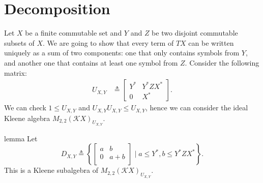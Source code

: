 \documentclass[a4paper,UKenglish,cleveref, autoref, thm-restate]{lipics-v2021}
\begin{document}
\section{Decomposition}
\label{sec:decomposition}

Let $X$ be a finite commutable set and $Y$ and $Z$ be two disjoint commutable
subsets of $X$.  We are going to show that every term of $TX$ can be written
uniquely as a sum of two components: one that only contains symbols from $Y$,
and another one that contains at least one symbol from $Z$. Consider the
following matrix:
\begin{align*}
  U_{X,Y} &  \triangleq 
      \begin{bmatrix}
        Y^* & Y^*ZX^* \\
        0 & X^*
      \end{bmatrix}.
\end{align*}
We can check $1  \leq  U_{X,Y}$ and $U_{X,Y}U_{X,Y}  \leq  U_{X,Y}$, hence we can consider
the ideal Kleene algebra $M_{2,2}(\mathcal{K}X)_{U_{X,Y}}$.

\begin{theoremEnd}{lemma}
  Let
  \[ D_{X,Y}  \triangleq  \left\{
      \begin{bmatrix}
        a & b \\
        0 & a + b \\
      \end{bmatrix}  \mid  a  \leq  Y^*, b  \leq  Y^*ZX^* \right\}. \]
  This is a Kleene subalgebra of $M_{2,2}(\mathcal{K}X)_{U_{X,Y}}$.
\end{theoremEnd}
\end{document}
